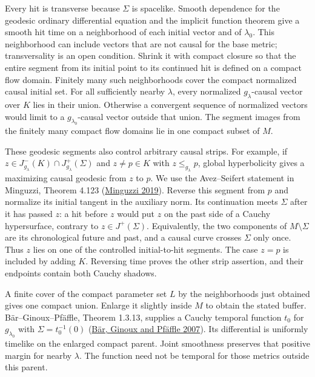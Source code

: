 \documentclass[
  english,
  11pt,
  reqno]{amsart}
\begin{document}
Every hit is transverse because \(\Sigma\) is spacelike. Smooth
dependence for the geodesic ordinary differential equation and the
implicit function theorem give a smooth hit time on a neighborhood of
each initial vector and of \(\lambda_0\). This neighborhood can include
vectors that are not causal for the base metric; transversality is an
open condition. Shrink it with compact closure so that the entire
segment from its initial point to its continued hit is defined on a
compact flow domain. Finitely many such neighborhoods cover the compact
normalized causal initial set. For all sufficiently nearby \(\lambda\),
every normalized \(g_\lambda\)-causal vector over \(K\) lies in their
union. Otherwise a convergent sequence of normalized vectors would limit
to a \(g_{\lambda_0}\)-causal vector outside that union. The segment
images from the finitely many compact flow domains lie in one compact
subset of \(M\).

These geodesic segments also control arbitrary causal strips. For
example, if \(z\in J^-_{g_\lambda}(K)\cap J^+_{g_\lambda}(\Sigma)\) and
\(z\ne p\in K\) with \(z\le_{g_\lambda}p\), global hyperbolicity gives a
maximizing causal geodesic from \(z\) to \(p\). We use the Avez--Seifert
statement in Minguzzi, Theorem 4.123
(\hyperref[ref-Minguzzi2019]{Minguzzi 2019}). Reverse this segment from
\(p\) and normalize its initial tangent in the auxiliary norm. Its
continuation meets \(\Sigma\) after it has passed \(z\): a hit before
\(z\) would put \(z\) on the past side of a Cauchy hypersurface,
contrary to \(z\in J^+(\Sigma)\). Equivalently, the two components of
\(M\setminus\Sigma\) are its chronological future and past, and a causal
curve crosses \(\Sigma\) only once. Thus \(z\) lies on one of the
controlled initial-to-hit segments. The case \(z=p\) is included by
adding \(K\). Reversing time proves the other strip assertion, and their
endpoints contain both Cauchy shadows.

A finite cover of the compact parameter set \(L\) by the neighborhoods
just obtained gives one compact union. Enlarge it slightly inside \(M\)
to obtain the stated buffer. Bär--Ginoux--Pfäffle, Theorem 1.3.13,
supplies a Cauchy temporal function \(t_0\) for \(g_{\lambda_0}\) with
\(\Sigma=t_0^{-1}(0)\) (\hyperref[ref-BarGinouxPfaeffle2007]{Bär, Ginoux
and Pfäffle 2007}). Its differential is uniformly timelike on the
enlarged compact parent. Joint smoothness preserves that positive margin
for nearby \(\lambda\). The function need not be temporal for those
metrics outside this parent.
\end{document}
